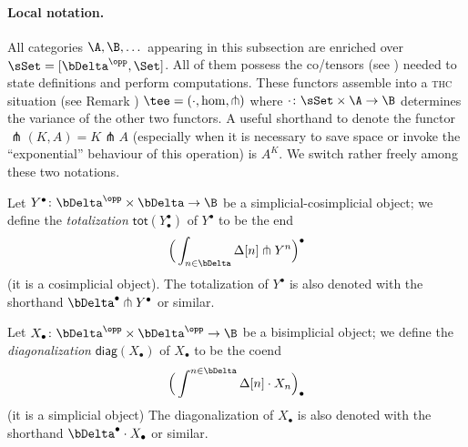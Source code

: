 \paragraph{\bf Local notation.} All categories $\A,\B,\dots$ appearing in this subsection are enriched over $\sSet = [\bDelta^\opp , \Set]$. All of them possess the co/tensors (see \adef{}) needed to state definitions and perform computations. These functors assemble into a \textsc{thc} situation (see Remark ) $\tee = (\cdot, \hom, \pitchfork)$ where $\cdot \colon \sSet \times \A \to \B$ determines the variance of the other two functors. A useful shorthand to denote the functor $\pitchfork(K,A) = K \pitchfork A$ (especially when it is necessary to save space or invoke the ``exponential'' behaviour of this operation) is $A^K$. We switch rather freely among these two notations.
\begin{definition}[Totalization]
Let $Y^\bullet \colon \bDelta^\opp \times \bDelta \to \B$ be a simplicial-cosimplicial object; we define the \emph{totalization} $\textsf{tot}(Y^\bullet_\bullet)$ of $Y^\bullet$ to be the end
\[
\Big(\int_{n\in\bDelta} \Delta[n]\pitchfork Y^n\Big)^\bullet
\]
(it is a cosimplicial object). The totalization of $Y^\bullet$ is also denoted with the shorthand $\bDelta^\bullet\pitchfork Y^\bullet$ or similar.
\end{definition}
\begin{definition}[Diagonalization]
Let $X_\bullet \colon \bDelta^\opp\times \bDelta^\opp \to \B$ be a bisimplicial object; we define the \emph{diagonalization} $\textsf{diag}(X_\bullet)$ of $X_\bullet$ to be the coend
\[
\Big(\int^{n\in\bDelta} \Delta[n]\cdot X_n\Big)_\bullet
\]
(it is a simplicial object) The diagonalization of $X_\bullet$ is also denoted with the shorthand $\bDelta^\bullet \cdot X_\bullet$ or similar.
\end{definition}
